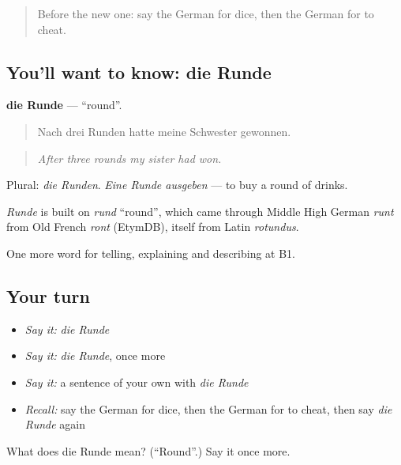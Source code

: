 \label{lesson:GE-C501-runde}



\begin{quote}
Before the new one: say the German for dice, then the German for to cheat.
\end{quote}

\subsection*{You'll want to know: die Runde}
\textbf{die Runde} — \textquotedblleft{}round\textquotedblright{}.

\begin{quote}
Nach drei Runden hatte meine Schwester gewonnen.
\end{quote}

\begin{quote}
\emph{After three rounds my sister had won.}
\end{quote}

Plural: \emph{die Runden}. \emph{Eine Runde ausgeben} — to buy a round of drinks.

\begin{cousinweb}
\emph{Runde} is built on \emph{rund} \textquotedblleft{}round\textquotedblright{}, which came through Middle High German \emph{runt} from Old French \emph{ront} (EtymDB), itself from Latin \emph{rotundus}.
\end{cousinweb}

\begin{grammarlens}[title={What you've built}]
One more word for telling, explaining and describing at B1.
\end{grammarlens}

\subsection*{Your turn}
\begin{itemize}
\raggedright
  \item \emph{Say it:} \emph{die Runde}
  \item \emph{Say it:} \emph{die Runde}, once more
  \item \emph{Say it:} a sentence of your own with \emph{die Runde}
  \item \emph{Recall:} say the German for dice, then the German for to cheat, then say \emph{die Runde} again
\end{itemize}

\begin{tcolorbox}[breakable,colback=teal!4,colframe=teal!35!black,title={Before you move on}]
What does die Runde mean? (\textquotedblleft{}Round\textquotedblright{}.) Say it once more.
\end{tcolorbox}
